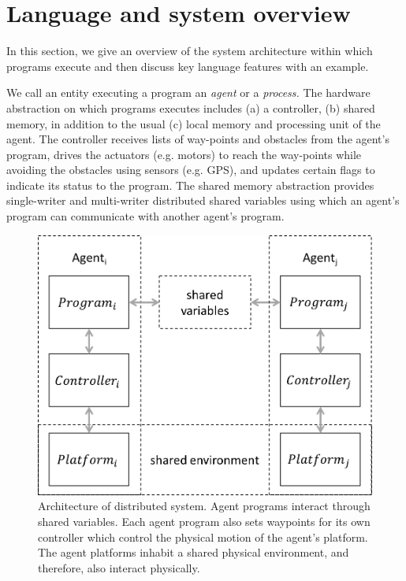 \section{Language and system overview}
\label{sect:Overview}
In this section, we give an overview of the system architecture within which \rolang programs execute and then discuss key language features with an example.

We call an entity executing a \rolang program an {\em agent\/} or a {\em process.\/}
The hardware abstraction on which \rolang programs executes includes (a) a controller, (b) shared memory, in addition to the usual (c) local memory and processing unit of the agent.  
%
The controller receives lists of way-points and obstacles from the agent's program, drives the actuators (e.g. motors) to reach the way-points while avoiding the obstacles using sensors (e.g. GPS), and updates certain flags to indicate its status to the program.
%
The shared memory abstraction provides single-writer and multi-writer distributed shared variables using which an agent's program can communicate with another agent's program. 

\begin{figure}[ht!]
	\centering
	\includegraphics[scale=0.4]{figs/arch.png}
	\caption{\small Architecture of distributed system. Agent programs interact through shared variables. Each agent program also sets waypoints for its own controller which control the physical motion of the agent's platform. The agent platforms inhabit a shared physical environment, and therefore, also interact physically.}
	\label{fig:arch}
\end{figure}

